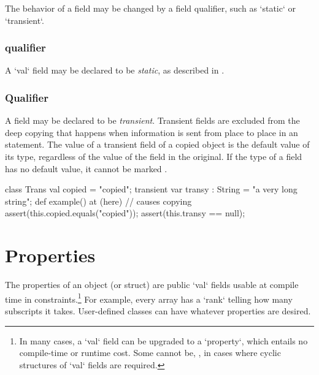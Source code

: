 The behavior of a field may be changed by a field qualifier, such as
\xcd`static` or \xcd`transient`.  


\subsubsection{ qualifier}

A \xcd`val` field may be declared to be {\em static}, as described in
. 

\subsubsection{ Qualifier}
\label{TransientFields}

A field may be declared to be {\em transient}.  Transient fields are excluded
from the deep copying that happens when information is sent from place to
place in an  statement.    The value of a transient field of a copied
object is the default value of its type, regardless of the value of the field
in the original.  If the type of a field has no
default value, it cannot be marked .
\begin{xten}
class Trans { 
   val copied = "copied";
   transient var transy : String = "a very long string";
   def example() {
      at (here) { // causes copying
         assert(this.copied.equals("copied"));
         assert(this.transy == null);
      }
   }
}
\end{xten}
%



\section{Properties}
\label{PropertiesInClasses}

The properties of an object (or struct) are  public \xcd`val` fields
usable at compile time in constraints.\footnote{In many cases, a 
\xcd`val` field can be upgraded to a \xcd`property`, which 
entails no compile-time or runtime cost.  Some cannot be, \eg, in cases where
cyclic structures of \xcd`val` fields are required.} 
For example,  every array has a \xcd`rank` telling
how many subscripts it takes.  User-defined classes can have whatever
properties are desired. 


